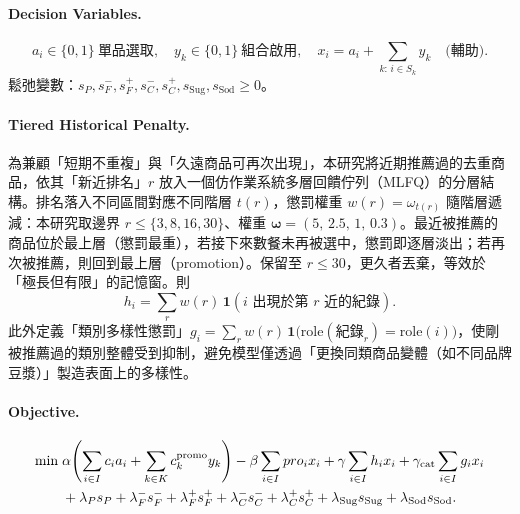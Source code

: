 \documentclass[a4paper]{article}
\begin{document}
\paragraph{Decision Variables.}\leavevmode
\[
a_i \in \{0,1\}\ \text{單品選取}, \quad
y_k \in \{0,1\}\ \text{組合啟用}, \quad
x_i = a_i + \sum_{k:\,i\in S_k} y_k \quad\text{(輔助)}.
\]
鬆弛變數：$s_P, s^-_{F}, s^+_{F}, s^-_{C}, s^+_{C}, s_{\text{Sug}}, s_{\text{Sod}} \ge 0$。

\paragraph{Tiered Historical Penalty.}為兼顧「短期不重複」與「久遠商品可再次出現」，本研究將近期推薦過的去重商品，依其「新近排名」$r$ 放入一個仿作業系統多層回饋佇列（MLFQ）的分層結構。排名落入不同區間對應不同階層 $t(r)$，懲罰權重 $w(r)=\omega_{t(r)}$ 隨階層遞減：本研究取邊界 $r\le\{3,8,16,30\}$、權重 $\boldsymbol{\omega}=(5,\,2.5,\,1,\,0.3)$。最近被推薦的商品位於最上層（懲罰最重），若接下來數餐未再被選中，懲罰即逐層淡出；若再次被推薦，則回到最上層（promotion）。保留至 $r\le 30$，更久者丟棄，等效於「極長但有限」的記憶窗。則
\[ h_i = \sum_{r} w(r)\,\mathbf{1}(i\text{ 出現於第 }r\text{ 近的紀錄}). \]
此外定義「類別多樣性懲罰」$g_i = \sum_{r} w(r)\,\mathbf{1}\!\big(\mathrm{role}(\text{紀錄}_r)=\mathrm{role}(i)\big)$，使剛被推薦過的類別整體受到抑制，避免模型僅透過「更換同類商品變體（如不同品牌豆漿）」製造表面上的多樣性。

\paragraph{Objective.}\leavevmode
\begin{align}
\min\;& \alpha\!\left(\sum_{i\in I} c_i a_i + \sum_{k\in K} c_k^{\text{promo}} y_k\right) - \beta\sum_{i\in I} pro_i x_i + \gamma\sum_{i\in I} h_i x_i + \gamma_{\text{cat}}\sum_{i\in I} g_i x_i \notag\\
& + \lambda_P s_P + \lambda^-_{F} s^-_{F} + \lambda^+_{F} s^+_{F} + \lambda^-_{C} s^-_{C} + \lambda^+_{C} s^+_{C} + \lambda_{\text{Sug}} s_{\text{Sug}} + \lambda_{\text{Sod}} s_{\text{Sod}}. \label{eq:obj}
\end{align}
\end{document}
